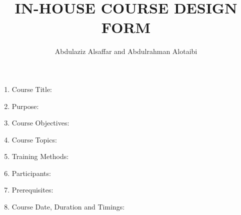 \documentclass[a4paper,11pt]{article}
\author{Abdulaziz Alsa{f}far and Abdulrahman Alotaibi}
\title{IN-HOUSE COURSE DESIGN FORM}
\begin{document}
\maketitle
\pagestyle{plain}
\setcounter{page}{1}

\begin{enumerate}
	\item Course Title:
	\item Purpose:
	\item Course Objectives:
	\item Course Topics:
	\item Training Methods:
	\item Participants:
	\item Prerequisites:
	\item Course Date, Duration and Timings:
\end{enumerate}
\end{document}

